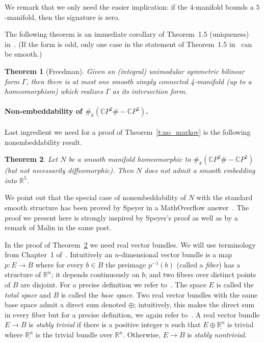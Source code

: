 \documentclass[10pt,a4paper]{article}
\newtheorem{theorem}{Theorem}
\theoremstyle{definition}
\theoremstyle{remark}
\newcommand{\R}{{\mathbb{R}}}
\newcommand{\CP}{{\mathbb{C}P}}
\begin{document}
 We remark that we only need the easier implication: if the $4$-manifold bounds
 a $5$-manifold, then the signature is zero.


The following theorem is an immediate corollary of Theorem~1.5 (uniqueness)
in~\cite{freedman82}. (If the form is odd, only one case in the statement of Theorem~1.5
in~\cite{freedman82} can be smooth.)

\begin{theorem}[Freedman]
\label{t:freedman}
 Given an (integral) unimodular symmetric bilinear form $\Gamma$, then there is at most
  one smooth simply connected 4-manifold (up to a homeomorphism) which realizes $\Gamma$ as its
  intersection form.
\end{theorem}

\paragraph{Non-embeddability of $\#_k (\CP^2 \# - \CP^2)$.}

Last ingredient we need for a proof of Theorem~\ref{t:no_markov} is the
following nonembeddability result. 

\begin{theorem}
\label{t:non_embed}
  Let $N$ be a smooth manifold homeomorphic to $\#_k (\CP^2 \# - \CP^2)$ (but
  not necessarily diffeomorphic). Then $N$ does not admit a smooth embedding
  into $\R^5$.
\end{theorem}
 

We point out that the special case of nonembeddability of $N$ with the standard
smooth structure has been proved by Speyer in a MathOverflow 
answer~\cite{speyer23}. The proof we present here is strongly inspired by
Speyer's proof as well as by a remark of Malin in the same post.

 
 In the proof of Theorem~\ref{t:non_embed} we need real vector bundles. We will
 use terminology from Chapter~1 of~\cite{hatcher17}. Intuitively an
 $n$-dimensional vector bundle is a map $p\colon E \to B$ where for every $b \in
 B$ the preimage $p^{-1}(b)$ (called a \emph{fiber}) has a structure of $\R^n$; it depends continuously
 on $b$; and two fibers over distinct points of $B$ are disjoint.
 For a precise definition we refer to~\cite{hatcher17}. The space $E$ is called
 the \emph{total space} and $B$ is called the \emph{base space}. Two real vector
 bundles with the same base space admit a direct sum denoted $\oplus$;
 intuitively, this makes the direct sum in every fiber but for a precise
 definition, we again refer to~\cite{hatcher17}. A real vector bundle $E \to B$ is \emph{stably trivial}
 if there is a positive integer $n$ such that $E \oplus \underline{\R^n}$ is
 trivial where $\underline{\R^n}$ is the trivial bundle over ${\R^n}$.
 Otherwise, $E \to B$ is \emph{stably nontrivial}.
\end{document}
